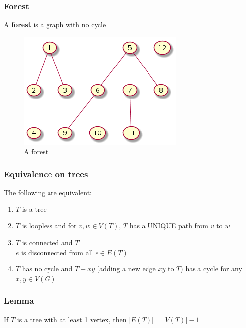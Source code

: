             \subsubsection{Forest}
            A \textbf{forest} is a graph with no cycle\\
            \begin{figure}[h]
                \centering
                \includegraphics[scale=0.5]{ressources/images/Forest.png}
                \caption{A forest}
                \label{Forest}
            \end{figure}
        \subsubsection{Equivalence on trees}
            The following are equivalent: \\
            \begin{enumerate}
                \item $T$ is a tree
                \item $T$ is loopless and for $v, w \in V(T)$, $T$ has a UNIQUE path from $v$ to $w$
                \item $T$ is connected and $T$\\$e$ is disconnected from all $e\in E(T)$
                \item $T$ has no cycle and $T + xy$ (adding a new edge $xy$ to $T$) has a cycle for any $x, y \in V(G)$
            \end{enumerate}
        \subsubsection{Lemma}
            If $T$ is a tree with at least 1 vertex, then $|E(T)|=|V(T)|-1$
